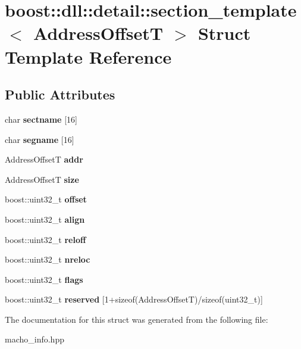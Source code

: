 \hypertarget{a01560}{}\section{boost\+:\+:dll\+:\+:detail\+:\+:section\+\_\+template$<$ Address\+OffsetT $>$ Struct Template Reference}
\label{a01560}
\subsection*{Public Attributes}
\begin{DoxyCompactItemize}
\item 
\mbox{\label{a01560_a8b501f770cc1ee98b714b7cf9cdd8f34}} 
char {\bfseries sectname} \mbox{[}16\mbox{]}
\item 
\mbox{\label{a01560_a61ccd03628bd8f07c658ed757b4e0b4d}} 
char {\bfseries segname} \mbox{[}16\mbox{]}
\item 
\mbox{\label{a01560_ae104edfac24b395a89aef36f944ef821}} 
Address\+OffsetT {\bfseries addr}
\item 
\mbox{\label{a01560_a4ba550b54c2203ec5db0dc4c57a6b815}} 
Address\+OffsetT {\bfseries size}
\item 
\mbox{\label{a01560_a6e71953aad1c9b6a6ddeccefbeadfb29}} 
boost\+::uint32\+\_\+t {\bfseries offset}
\item 
\mbox{\label{a01560_a310eedf4a7240faa70c674310da293c1}} 
boost\+::uint32\+\_\+t {\bfseries align}
\item 
\mbox{\label{a01560_a50213c30eaf442405471a3806ea32aad}} 
boost\+::uint32\+\_\+t {\bfseries reloff}
\item 
\mbox{\label{a01560_aa5c8851e07eee5390e78650ca86e06a8}} 
boost\+::uint32\+\_\+t {\bfseries nreloc}
\item 
\mbox{\label{a01560_a8c51bc2ae0b5c85f22cbc00d508f3316}} 
boost\+::uint32\+\_\+t {\bfseries flags}
\item 
\mbox{\label{a01560_ac077492c8b6694c4514290449c354917}} 
boost\+::uint32\+\_\+t {\bfseries reserved} \mbox{[}1+sizeof(Address\+OffsetT)/sizeof(uint32\+\_\+t)\mbox{]}
\end{DoxyCompactItemize}


The documentation for this struct was generated from the following file\+:\begin{DoxyCompactItemize}
\item 
macho\+\_\+info.\+hpp\end{DoxyCompactItemize}
